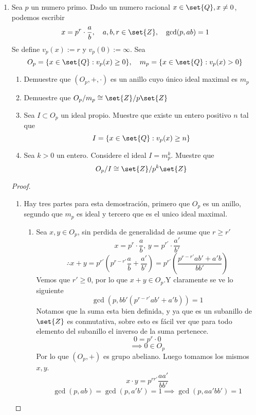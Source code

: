 \documentclass[11pt]{article}
\begin{document}
\begin{enumerate}
        \item Sea $p$ un numero primo. Dado un numero racional $x\in\set{Q},x\neq 0$, podemos escribir
        \[x=p^r\cdot\frac{a}{b},\quad a,b,r\in\set{Z},\quad \gcd(p, ab)=1\]
        Se define $v_p(x):=r$ y $v_p(0):=\infty$. Sea
        \[O_p=\{x\in\set{Q}:v_p(x)\geq 0\},\quad m_p=\{x\in\set{Q}:v_p(x)>0\}\]
        \begin{enumerate}[label=(\alph*)]
            \item Demuestre que $(O_p,+,\cdot)$ es un anillo cuyo único ideal maximal es $m_p$

            \item Demuestre que $O_p/m_p\cong\set{Z}/p\set{Z}$
            
            \item Sea $I\subset O_p$ un ideal propio. Muestre que existe un entero positivo $n$ tal que
            \[I=\{x\in\set{Q}:v_p(x)\geq n\}\]

            \item Sea $k>0$ un entero. Considere el ideal $I=m_p^k$. Muestre que
            \[O_p/I\cong\set{Z}/p^k\set{Z}\]
        \end{enumerate}
        \begin{proof}
            \
            \begin{enumerate}[label=(\alph*)]
                \item Hay tres partes para esta demostración, primero que $O_p$ es un anillo, segundo que $m_p$ es ideal y tercero que es el unico ideal maximal.
                \begin{enumerate}
                    \item Sea $x,y\in O_p$, sin perdida de generalidad de asume que $r\geq r'$
                    \[x=p^r\cdot\frac{a}{b},\,y=p^{r'}\cdot\frac{a'}{b'}\]
                    \[\therefore x+ y=p^{r'}\left(p^{r-r'}\frac{a}{b}+ \frac{a'}{b'}\right)=p^{r'}\left(\frac{p^{r-r'}ab'+a'b}{bb'}\right)\]
                    Vemos que $r'\geq 0$, por lo que $x+y\in O_p$.Y claramente se ve lo siguiente
                    \[\gcd\left(p,bb'\left(p^{r-r'}ab'+a'b\right)\right)=1\]
                    Notamos que la suma esta bien definida, y ya que es un subanillo de $\set{Z}$ es conmutativa, sobre esto es fácil ver que para todo elemento del subanillo el inverso de la suma pertenece.
                    \[0=p^r\cdot 0\]
                    \[\implies 0\in O_p\]
                    Por lo que $(O_p,+)$ es grupo abeliano. Luego tomamos los mismos $x,y$.
                    \[x\cdot y=p^{rr'}\frac{aa'}{bb'}\]
                    \[\gcd(p,ab)=\gcd(p,a'b')=1\implies\gcd(p,aa'bb')=1\]


\end{enumerate}
\end{enumerate}
\end{proof}
\end{enumerate}
\end{document}
